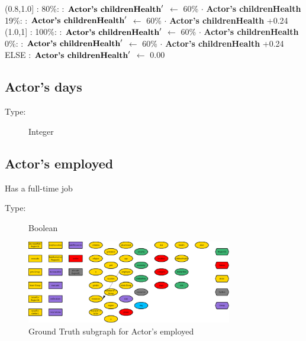 \documentclass{article}%
\begin{document}
\begin{flushleft}
(0.8,1.0{]}%
: %
\linebreak%
\hspace*{6em}%
80\%:%
: %
$\mbox{\textbf{Actor's childrenHealth}} '$%
$\leftarrow$%
60\%%
$\cdot$%
\textbf{Actor's childrenHealth}%
\linebreak%
\hspace*{6em}%
19\%:%
: %
$\mbox{\textbf{Actor's childrenHealth}} '$%
$\leftarrow$%
60\%%
$\cdot$%
\textbf{Actor's childrenHealth}%
+0.24%
\linebreak%
\hspace*{4em}%
(1.0,1{]}%
: %
\linebreak%
\hspace*{6em}%
100\%:%
: %
$\mbox{\textbf{Actor's childrenHealth}} '$%
$\leftarrow$%
60\%%
$\cdot$%
\textbf{Actor's childrenHealth}%
\linebreak%
\hspace*{6em}%
0\%:%
: %
$\mbox{\textbf{Actor's childrenHealth}} '$%
$\leftarrow$%
60\%%
$\cdot$%
\textbf{Actor's childrenHealth}%
+0.24%
\linebreak%
\hspace*{2em}%
ELSE %
: %
$\mbox{\textbf{Actor's childrenHealth}} '$%
$\leftarrow$%
0.00%
\end{flushleft}

%
\subsection{Actor's days}%
\label{subsec:Actor's days}%
\begin{description}%
\item[Type:]%
Integer%
\end{description}

%
\subsection{Actor's employed}%
\label{subsec:Actor's employed}%
Has a full{-}time job%
\begin{description}%
\item[Type:]%
Boolean%
\end{description}%


\begin{figure}[ht]%
\centering%
\includegraphics[width=0.8\textwidth]{images/employedOfActor.png}%
\caption{Ground Truth subgraph for Actor's employed}%
\end{figure}
\end{document}
